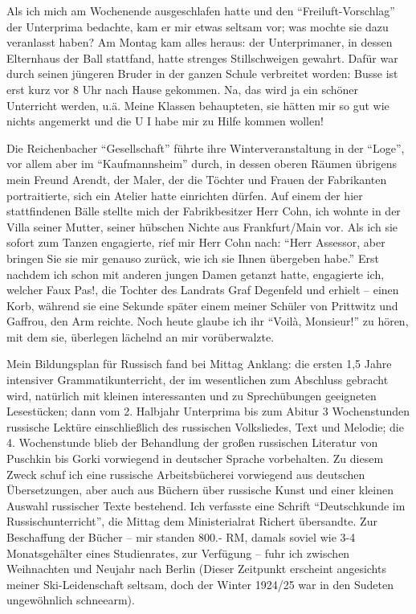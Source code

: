Als ich mich am Wochenende ausgeschlafen hatte und den \enquote{Freiluft-Vor\-schlag} der Unterprima bedachte, kam er mir etwas seltsam vor; was mochte sie dazu veranlasst haben? Am Montag kam alles heraus: der Unterprimaner, in dessen Elternhaus der Ball stattfand, hatte strenges Stillschweigen gewahrt. Dafür war durch seinen jüngeren Bruder in der ganzen Schule verbreitet worden: Busse ist erst kurz vor 8 Uhr nach Hause gekommen. Na, das wird ja ein schöner Unterricht werden, u.ä. Meine Klassen behaupteten, sie hätten mir so gut wie nichts angemerkt und die U I habe mir zu Hilfe kommen wollen!

Die Reichenbacher \enquote{Gesellschaft} führte ihre Winterveranstaltung in der \enquote{Loge}, vor allem aber im \enquote{Kaufmannsheim} durch, in dessen oberen Räumen übrigens mein Freund Arendt, der Maler, der die Töchter und Frauen der Fabrikanten portraitierte, sich ein Atelier hatte einrichten dürfen. Auf einem der hier stattfindenen Bälle stellte mich der Fabrikbesitzer Herr Cohn, ich wohnte in der Villa seiner Mutter, seiner hübschen Nichte aus Frank\-furt/Main vor. Als ich sie sofort zum Tanzen engagierte, rief mir Herr Cohn nach: \enquote{Herr Assessor, aber bringen Sie sie mir genauso zurück, wie ich sie Ihnen übergeben habe.} Erst nachdem ich schon mit anderen jungen Damen getanzt hatte, engagierte ich, welcher Faux Pas!, die Tochter des Landrats Graf Degenfeld und erhielt -- einen Korb, während sie eine Sekunde später einem meiner Schüler von Prittwitz und Gaffrou, den Arm reichte. Noch heute glaube ich ihr \enquote{Voilà, Monsieur!} zu hören, mit dem sie, überlegen lächelnd an mir vorüberwalzte.

Mein Bildungsplan für Russisch fand bei Mittag Anklang: die ersten 1,5 Jahre intensiver Grammatikunterricht, der im wesentlichen zum Abschluss gebracht wird, natürlich mit kleinen interessanten und zu Sprechübungen geeigneten Lesestücken; dann vom 2. Halbjahr Unterprima bis zum Abitur 3 Wochenstunden russische Lektüre einschließlich des russischen Volksliedes, Text und Melodie; die 4. Wochenstunde blieb der Behandlung der großen russischen Literatur von Puschkin bis Gorki vorwiegend in deutscher Sprache vorbehalten. Zu diesem Zweck schuf ich eine russische Arbeitsbücherei vorwiegend aus deutschen Übersetzungen, aber auch aus Büchern über russische Kunst und einer kleinen Auswahl russischer Texte bestehend. Ich verfasste eine Schrift \enquote{Deutschkunde im Russischunterricht}, die Mittag dem Ministerialrat Richert übersandte. Zur Beschaffung der Bücher -- mir standen 800.- RM, damals soviel wie 3-4 Monatsgehälter eines Studienrates, zur Verfügung -- fuhr ich zwischen Weihnachten und Neujahr nach Berlin (Dieser Zeitpunkt erscheint angesichts meiner Ski-Leidenschaft seltsam, doch der Winter 1924/25 war in den Sudeten ungewöhnlich schneearm). 

